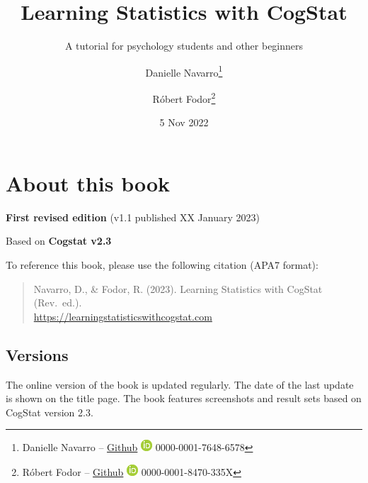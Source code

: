 \documentclass[
]{book}
\title{Learning Statistics with CogStat}
\subtitle{A tutorial for psychology students and other beginners}
\author{Danielle Navarro\footnote{Danielle Navarro -- \href{https://github.com/djnavarro/}{Github} \textbar{} \href{https://orcid.org/0000-0001-7648-6578}{\includegraphics{resources/image/orcid_16x16.png}} 0000-0001-7648-6578} \and Róbert Fodor\footnote{Róbert Fodor -- \href{https://github.com/robertfodor/}{Github} \textbar{} \href{https://orcid.org/0000-0001-8470-335X}{\includegraphics{resources/image/orcid_16x16.png}} 0000-0001-8470-335X}}
\date{5 Nov 2022}
\let\oldmaketitle\maketitle
\theoremstyle{definition}
\theoremstyle{definition}
\theoremstyle{definition}
\theoremstyle{definition}
\theoremstyle{remark}
\begin{document}
\maketitle

\frontmatter
{} %

\newpage
\let\maketitle\oldmaketitle
\maketitle
{} %
\setcounter{page}{1}

\mainmatter
{}

{
\hypersetup{linkcolor=black}
\setcounter{tocdepth}{1}
\tableofcontents
}
\hypertarget{about-this-book}{%
\chapter*{About this book}\label{about-this-book}}

\textbf{First revised edition} (v1.1 published XX January 2023)

Based on \textbf{Cogstat v2.3}

To reference this book, please use the following citation (APA7 format):

\begin{quote}
Navarro, D., \& Fodor, R. (2023). Learning Statistics with CogStat (Rev.~ed.).\\
\url{https://learningstatisticswithcogstat.com}
\end{quote}

\hypertarget{versions}{%
\section*{Versions}\label{versions}}

The online version of the book is updated regularly. The date of the last update is shown on the title page. The book features screenshots and result sets based on CogStat version 2.3.
\end{document}
